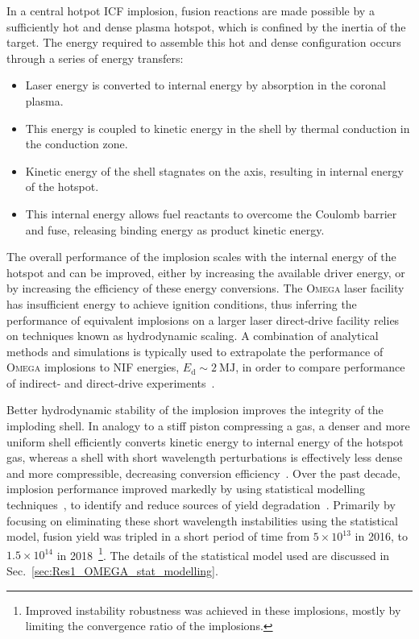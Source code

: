 In a central hotpot \ac{ICF} implosion, fusion reactions are made possible by a sufficiently hot and dense plasma hotspot, which is confined by the inertia of the target.
The energy required to assemble this hot and dense configuration occurs through a series of energy transfers:
\begin{itemize}
    \item Laser energy is converted to internal energy by absorption in the coronal plasma.
    \item This energy is coupled to kinetic energy in the shell by thermal conduction in the conduction zone.
    \item Kinetic energy of the shell stagnates on the axis, resulting in internal energy of the hotspot.
    \item This internal energy allows fuel reactants to overcome the Coulomb barrier and fuse, releasing binding energy as product kinetic energy.
\end{itemize}
The overall performance of the implosion scales with the internal energy of the hotspot and can be improved, either by increasing the available driver energy, or by increasing the efficiency of these energy conversions.
The \textsc{Omega} laser facility has insufficient energy to achieve ignition conditions, thus inferring the performance of equivalent implosions on a larger laser direct-drive facility relies on techniques known as hydrodynamic scaling.
A combination of analytical methods and simulations is typically used to extrapolate the performance of \textsc{Omega} implosions to \ac{NIF} energies, $E_{\text{d}}\sim2\ \text{MJ}$, in order to compare performance of indirect- and direct-drive experiments~\cite{zhou_hydrodynamic_2007}.

Better hydrodynamic stability of the implosion improves the integrity of the imploding shell.
In analogy to a stiff piston compressing a gas, a denser and more uniform shell efficiently converts kinetic energy to internal energy of the hotspot gas, whereas a shell with short wavelength perturbations is effectively less dense and more compressible, decreasing conversion efficiency~\cite{betti_deceleration_2002}.
Over the past decade, implosion performance improved markedly by using statistical modelling techniques~\cite{lees_experimentally_2021}, to identify and reduce sources of yield degradation~\cite{lees_understanding_2023}.
Primarily by focusing on eliminating these short wavelength instabilities using the statistical model, fusion yield was tripled in a short period of time from $5\times10^{13}$ in 2016, to $1.5\times10^{14}$ in 2018~\cite{gopalaswamy_tripled_2019}\footnote{Improved instability robustness was achieved in these implosions, mostly by limiting the convergence ratio of the implosions.}.
The details of the statistical model used are discussed in Sec.~\ref{sec:Res1_OMEGA_stat_modelling}.

